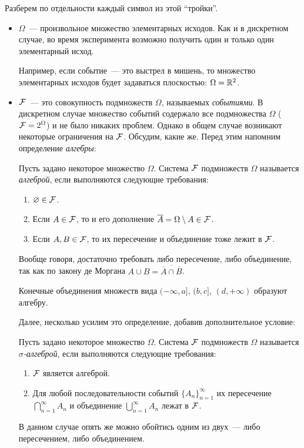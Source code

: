 Разберем по отдельности каждый символ из этой ``тройки''.
\begin{itemize}
	\item \(\Omega\)~--- произвольное множество элементарных исходов. Как и в дискретном случае, во время эксперимента возможно получить один и только один элементарный исход.
	
	Например, если событие~--- это выстрел в мишень, то множество элементарных исходов будет задаваться плоскостью: \(\Omega = \mathbb{R}^2\).
	
	\item \(\mathcal{F}\)~--- это совокупность подмножеств \(\Omega\), называемых \emph{событиями}. В дискретном случае множество событий содержало все подмножества \(\Omega\) (\(\mathcal{F} = 2^{\Omega}\)) и не было никаких проблем. Однако в общем случае возникают некоторые ограничения на \(\mathcal{F}\). Обсудим, какие же. Перед этим напомним определение \emph{алгебры}:
	\begin{definition}
		Пусть задано некоторое множество \(\Omega\). Система \(\mathcal{F}\) подмножеств \(\Omega\) называется \emph{алгеброй}, если выполняются следующие требования:
		\begin{enumerate}
			\item \(\varnothing \in \mathcal{F}\).
			\item Если \(A \in \mathcal{F}\), то и его дополнение \(\overline{A} = \Omega \setminus A \in \mathcal{F}\).
			\item Если \(A, B \in \mathcal{F}\), то их пересечение и объединение тоже лежит в \(\mathcal{F}\).
		\end{enumerate}
	\end{definition}
	Вообще говоря, достаточно требовать либо пересечение, либо объединение, так как по закону де Моргана \(A \cup B = \overline{\overline{A} \cap \overline{B}}\).
	\begin{example}
		Конечные объединения множеств вида \((-\infty, a]\), \((b, c]\), \((d, +\infty)\) образуют алгебру.
	\end{example}
	Далее, несколько усилим это определение, добавив дополнительное условие:
	\begin{definition}
		Пусть задано некоторое множество \(\Omega\). Система \(\mathcal{F}\) подмножеств \(\Omega\) называется \emph{\(\sigma\)-алгеброй}, если выполняются следующие требования:
		\begin{enumerate}
			\item \(\mathcal{F}\) является алгеброй.
			\item Для любой последовательности событий \(\{A_n\}_{n = 1}^{\infty}\) их пересечение
                \(\bigcap\limits_{n = 1}^{\infty} A_n\) и объединение \(\bigcup\limits_{n = 1}^{\infty} A_n\) лежат в \(\mathcal{F}\).
		\end{enumerate}
	\end{definition}
	В данном случае опять же можно обойтись одним из двух~--- либо пересечением, либо объединением.
	

\end{itemize}
